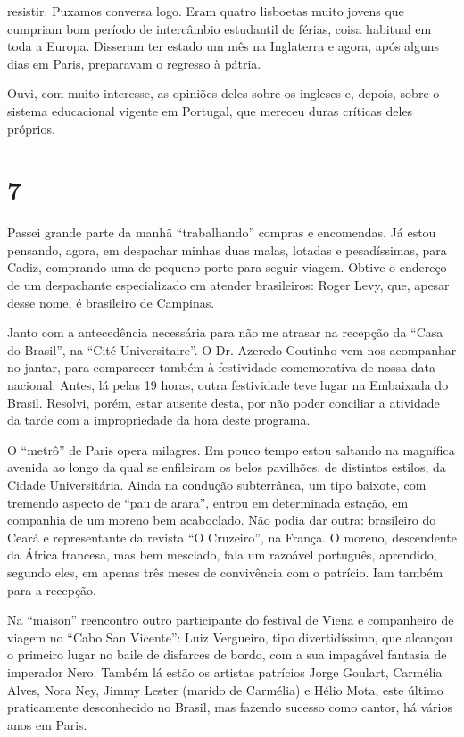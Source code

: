 resistir. Puxamos conversa logo. Eram quatro lisboetas muito jovens que cumpriam bom período de intercâmbio estudantil de férias, coisa habitual em toda a Europa. Disseram ter estado um mês na Inglaterra e agora, após alguns dias em Paris, preparavam o regresso à pátria.

Ouvi, com muito interesse, as opiniões deles sobre os ingleses e, depois, sobre o sistema educacional vigente em Portugal, que mereceu duras críticas deles próprios.

\section*{7 \adfflatleafright {}}
Passei grande parte da manhã “trabalhando” compras e encomendas. Já estou pensando, agora, em despachar minhas duas malas, lotadas e pesadíssimas, para Cadiz, comprando uma de pequeno porte para seguir viagem. Obtive o endereço de um despachante especializado em atender brasileiros: Roger Levy, que, apesar desse nome, é brasileiro de Campinas.

Janto com a antecedência necessária para não me atrasar na recepção da “Casa do Brasil”, na “Cité Universitaire”. O Dr. Azeredo Coutinho vem nos acompanhar no jantar, para comparecer também à festividade comemorativa de nossa data nacional. Antes, lá pelas 19 horas, outra festividade teve lugar na Embaixada do Brasil. Resolvi, porém, estar ausente desta, por não poder conciliar a atividade da tarde com a impropriedade da hora deste programa.

O “metrô” de Paris opera milagres. Em pouco tempo estou saltando na magnífica avenida ao longo da qual se enfileiram os belos pavilhões, de distintos estilos, da Cidade Universitária. Ainda na condução subterrânea, um tipo baixote, com tremendo aspecto de “pau de arara”, entrou em determinada estação, em companhia de um moreno bem acaboclado. Não podia dar outra: brasileiro do Ceará e representante da revista “O Cruzeiro”, na França. O moreno, descendente da África francesa, mas bem mesclado, fala um razoável português, aprendido, segundo eles, em apenas três meses de convivência com o patrício. Iam também para a recepção.

Na “maison” reencontro outro participante do festival de Viena e companheiro de viagem no “Cabo San Vicente”: Luiz Vergueiro, tipo divertidíssimo, que alcançou o primeiro lugar no baile de disfarces de bordo, com a sua impagável fantasia de imperador Nero. Também lá estão os artistas patrícios Jorge Goulart, Carmélia Alves, Nora Ney, Jimmy Lester (marido de Carmélia) e Hélio Mota, este último praticamente desconhecido no Brasil, mas fazendo sucesso como cantor, há vários anos em Paris.

